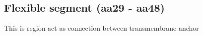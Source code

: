 \subsection{Flexible segment (aa29 - aa48)}

This is region act as connection between transmembrane anchor 
